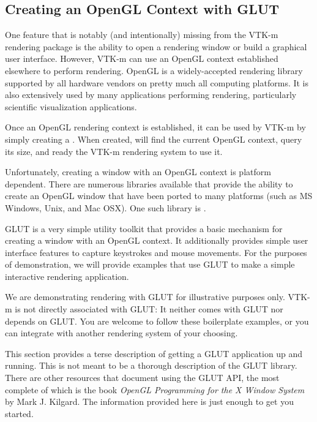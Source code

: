 \subsection{Creating an OpenGL Context with GLUT}


One feature that is notably (and intentionally) missing from the VTK-m
rendering package is the ability to open a rendering window or build a
graphical user interface. However, VTK-m can use an OpenGL context
established elsewhere to perform rendering. OpenGL is a widely-accepted
rendering library supported by all hardware vendors on pretty much all
computing platforms. It is also extensively used by many applications
performing rendering, particularly scientific visualization applications.

Once an OpenGL rendering context is established, it can be used by VTK-m by
simply creating a . When created,
 will find the current OpenGL context, query its
size, and ready the VTK-m rendering system to use it.

Unfortunately, creating a window with an OpenGL context is platform
dependent. There are numerous libraries available that provide the ability
to create an OpenGL window that have been ported to many platforms (such as
MS Windows, Unix, and Mac OSX). One such library is .

GLUT is a very simple utility toolkit that provides a basic mechanism for
creating a window with an OpenGL context. It additionally provides simple
user interface features to capture keystrokes and mouse movements. For the
purposes of demonstration, we will provide examples that use GLUT to make a
simple interactive rendering application.

\begin{didyouknow}
  We are demonstrating rendering with GLUT for illustrative purposes only.
  VTK-m is not directly associated with GLUT: It neither comes with GLUT
  nor depends on GLUT. You are welcome to follow these boilerplate
  examples, or you can integrate with another rendering system of your
  choosing.
\end{didyouknow}

This section provides a terse description of getting a GLUT application up
and running. This is not meant to be a thorough description of the GLUT
library. There are other resources that document using the GLUT API, the
most complete of which is the book \emph{OpenGL Programming for the X
  Window System} by Mark J. Kilgard. The information provided here is just
enough to get you started.

